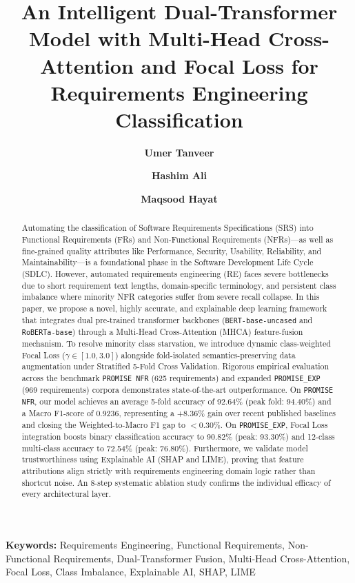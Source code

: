 \documentclass[11pt,a4paper]{article}
\title{\LARGE \textbf{An Intelligent Dual-Transformer Model with Multi-Head Cross-Attention and Focal Loss for Requirements Engineering Classification}}
\author[1]{\textbf{Umer Tanveer}}
\author[1]{\textbf{Hashim Ali}}
\author[1]{\textbf{Maqsood Hayat}}
\affil[1]{Department of Computer Science, Abdul Wali Khan University Mardan, Mardan, Pakistan}
\date{}
\begin{document}
\maketitle

\begin{abstract}
Automating the classification of Software Requirements Specifications (SRS) into Functional Requirements (FRs) and Non-Functional Requirements (NFRs)—as well as fine-grained quality attributes like Performance, Security, Usability, Reliability, and Maintainability—is a foundational phase in the Software Development Life Cycle (SDLC). However, automated requirements engineering (RE) faces severe bottlenecks due to short requirement text lengths, domain-specific terminology, and persistent class imbalance where minority NFR categories suffer from severe recall collapse. In this paper, we propose a novel, highly accurate, and explainable deep learning framework that integrates dual pre-trained transformer backbones (\texttt{BERT-base-uncased} and \texttt{RoBERTa-base}) through a Multi-Head Cross-Attention (MHCA) feature-fusion mechanism. To resolve minority class starvation, we introduce dynamic class-weighted Focal Loss ($\gamma \in [1.0, 3.0]$) alongside fold-isolated semantics-preserving data augmentation under Stratified 5-Fold Cross Validation. Rigorous empirical evaluation across the benchmark \texttt{PROMISE NFR} (625 requirements) and expanded \texttt{PROMISE\_EXP} (969 requirements) corpora demonstrates state-of-the-art outperformance. On \texttt{PROMISE NFR}, our model achieves an average 5-fold accuracy of 92.64\% (peak fold: 94.40\%) and a Macro F1-score of 0.9236, representing a +8.36\% gain over recent published baselines and closing the Weighted-to-Macro F1 gap to $<0.30\%$. On \texttt{PROMISE\_EXP}, Focal Loss integration boosts binary classification accuracy to 90.82\% (peak: 93.30\%) and 12-class multi-class accuracy to 72.54\% (peak: 76.80\%). Furthermore, we validate model trustworthiness using Explainable AI (SHAP and LIME), proving that feature attributions align strictly with requirements engineering domain logic rather than shortcut noise. An 8-step systematic ablation study confirms the individual efficacy of every architectural layer.
\end{abstract}

\textbf{Keywords:} Requirements Engineering, Functional Requirements, Non-Functional Requirements, Dual-Transformer Fusion, Multi-Head Cross-Attention, Focal Loss, Class Imbalance, Explainable AI, SHAP, LIME
\end{document}
